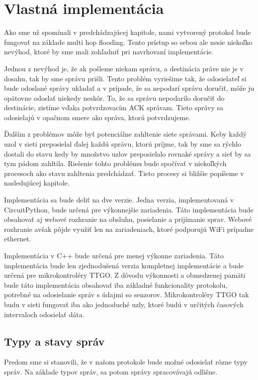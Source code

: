 \documentclass[slovak,master]{diploma}
\begin{document}
\chapter{Vlastná implementácia}
Ako sme už spomínali v predchádzajúcej kapitole, nami vytvorený protokol bude fungovať na základe multi hop flooding. Tento prístup so sebou ale nesie 
niekoľko nevýhod, ktoré by sme mali zohľadniť pri navrhovaní implementácie.

Jednou z nevýhod je, že ak pošleme niekam správu, a destinácia práve nie je v dosahu, tak by sme správu prišli. Tento problém vyriešime tak, 
že odosielateľ si bude odoslané správy ukladať a v prípade, že sa nepodarí správu doručiť, môže ju opätovne 
odoslať niekedy neskôr. To, že sa správu nepodarilo doručiť do destinácie, zistíme vďaka potvrdzovacím ACK správam. Tieto správy sa odosielajú v opačnom smere ako správa, ktorú potvrdzujeme. 

Ďalším z problémov môže byť potenciálne zahltenie siete správami. Keby každý uzol v sieti preposielal ďalej každú správu, ktorú príjme, tak by sme sa rýchlo dostali 
do stavu kedy by množstvo uzlov preposielalo rovnaké správy a sieť by sa tym pádom zahltila.
Riešenie tohto problému bude spočívať v niekoľkých procesoch ako stavu zahltenia predchádzať. Tieto procesy si bližšie popíšeme v nasledujúcej kapitole.

Implementácia sa bude deliť na dve verzie. Jedna verzia, implementovaná v CircuitPython, bude určená pre výkonnejšie zariadenia. Táto implementácia bude obsahovať aj webové rozhranie na 
obsluhu, posielanie a prijímanie sprav. Webové rozhranie avšak pôjde využiť len na zariadeniach, ktoré podporujú WiFi prípadne ethernet.

Implementácia v C++ bude určená pre menej výkonne zariadenia. Táto implementácia bude len zjednodušená verzia kompletnej implementácie a 
bude určená pre mikrokontroléry TTGO. Z dôvodu výkonnosti a obmedzenej pamäti bude táto implementácia obsahovať iba základné funkcionality protokolu, potrebné na odosielanie správ s 
údajmi so senzorov. Mikrokontroléry TTGO tak budu v sieti fungovať iba ako jednoduché uzly, ktoré budú v určitých časových intervaloch odosielať dáta.

\section{Typy a stavy správ}
Predom sme si stanovili, že v našom protokole bude možné odosielať rôzne typy správ. Na základe typov správ, sa potom správy spracovávajú odlišne.
\end{document}

